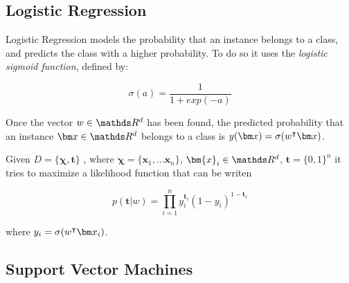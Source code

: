   \subsection{Logistic Regression}
  \begin{pre-delivery}
    Logistic Regression models the probability that an instance belongs to
    a class, and predicts the class with a higher probability. To do so it
    uses the \textit{logistic sigmoid function}, defined by:

    \begin{equation}
      \sigma(a) = \frac{1}{1 + exp(-a)}
    \end{equation}

     Once the vector $w \in \reals^d$ has been found, the predicted probability
     that an instance $\vx \in \reals^d$ belongs to a class is
     $y(\vx) = \sigma(w^\transp\vx)$.


     Given
     $D = \{\bm{\chi}, \bm{t}\}$
     , where
     $\bm{\chi} = \{\bm{x}_1, \ldots \bm{x}_n\}$, $\bm{x}_i \in \reals^d$, $\bm{t} = \{0, 1\}^n$
     it tries to maximize a likelihood function that can be writen

     \begin{equation}
       p(\bm{t} | w) = \prod_{i = 1}^n y_i^{\bm{t}_i} (1 - y_i)^{1 - \bm{t}_i}
     \end{equation}

     where $y_i = \sigma(w^\transp\vx_i)$.

  \end{pre-delivery}
  \subsection{Support Vector Machines}

